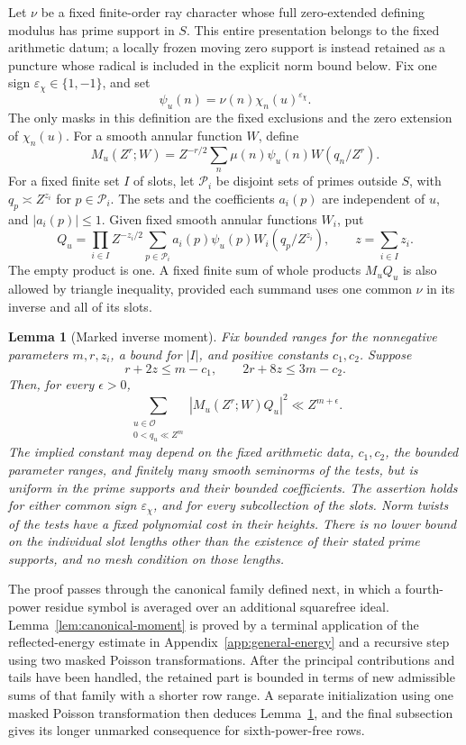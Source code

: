 \documentclass[12pt]{article}
\newtheorem{lemma}[theorem]{Lemma}
\begin{document}
Let \(\nu\) be a fixed finite-order ray character whose full
zero-extended defining modulus has prime support in \(S\).  This entire
presentation belongs to the fixed arithmetic datum; a locally frozen
moving zero support is instead retained as a puncture whose radical is
included in the explicit norm bound below.
Fix one sign \(\varepsilon_\chi\in\{1,-1\}\), and set
\[
 \psi_u(n)=\nu(n)\chi_n(u)^{\varepsilon_\chi}.
\]
The only masks in this definition are the fixed exclusions and the zero
extension of \(\chi_n(u)\).
For a smooth annular function \(W\), define
\[
 M_u(Z^r;W)=Z^{-r/2}\sum_n\mu(n)\psi_u(n)W(q_n/Z^r).
\]
For a fixed finite set \(I\) of slots, let \(\mathcal P_i\) be disjoint
sets of primes outside \(S\), with \(q_p\asymp Z^{z_i}\) for
\(p\in\mathcal P_i\).  The sets and the coefficients \(a_i(p)\) are
independent of \(u\), and \(|a_i(p)|\le1\).  Given fixed smooth annular
functions \(W_i\), put
\[
 Q_u=\prod_{i\in I}Z^{-z_i/2}
       \sum_{p\in\mathcal P_i}a_i(p)\psi_u(p)W_i(q_p/Z^{z_i}),
 \qquad z=\sum_{i\in I}z_i.
\]
The empty product is one.
A fixed finite sum of whole products \(M_uQ_u\) is also allowed by
triangle inequality, provided each summand uses one common \(\nu\)
in its inverse and all of its slots.

\begin{lemma}[Marked inverse moment]\label{lem:marked}
Fix bounded ranges for the nonnegative parameters \(m,r,z_i\), a bound
for \(|I|\), and positive constants \(c_1,c_2\).  Suppose
\[
 r+2z\le m-c_1,\qquad 2r+8z\le3m-c_2.
\]
Then, for every \(\epsilon>0\),
\begin{equation}\label{old-eq:4.1}
 \sum_{\substack{u\in\mathcal O\\0<q_u\ll Z^m}}
       |M_u(Z^r;W)Q_u|^2\ll Z^{m+\epsilon}.
\end{equation}
The implied constant may depend on the fixed arithmetic data, \(c_1,c_2\),
the bounded parameter ranges, and finitely many smooth seminorms of the
tests, but is uniform in the prime supports and their bounded coefficients.
The assertion holds for either common sign \(\varepsilon_\chi\), and for
every subcollection of the slots.  Norm twists of the tests have a fixed
polynomial cost in their heights.  There is no lower bound on the individual
slot lengths other than the existence of their stated prime supports, and
no mesh condition on those lengths.
\end{lemma}

The proof passes through the canonical family defined next, in which a
fourth-power residue symbol is averaged over an additional squarefree
ideal.  Lemma~\ref{lem:canonical-moment} is proved by a terminal application
of the reflected-energy estimate in Appendix~\ref{app:general-energy} and a recursive step using two masked
Poisson transformations.  After the principal contributions and tails have
been handled, the retained part is bounded in terms of new admissible sums
of that family with a shorter row range.  A separate initialization using
one masked Poisson transformation then deduces Lemma~\ref{lem:marked}, and
the final subsection gives its longer unmarked consequence for
sixth-power-free rows.
\end{document}
